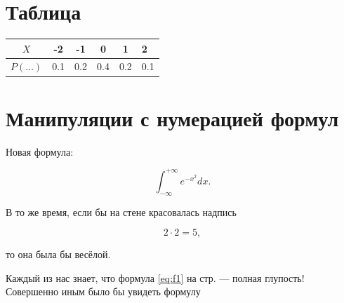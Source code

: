 \documentclass[12pt, a4paper]{article}  %
\begin{document}
% 
% 
%



\section{Таблица} 

\begin{tabular}{|c|c|c|cc|p{6cm}|}
	\hline
	$X$ & -2 & -1 & 0 & 1 & 2 \\
	\hline
	$P(\ldots)$ & 0.1 & 0.2 & 0.4 & 0.2 & 0.1 \\
\end{tabular}





\newpage  %

\section{Манипуляции с нумерацией формул} 

Новая формула: 

\begin{equation}
\int_{-\infty}^{+\infty} e^{-x^2} dx.
\end{equation}

В то же время, если бы на стене красовалась надпись

\begin{equation}\label{eq:f1}
2 \cdot 2 = 5,
\end{equation}

то она была бы весёлой.

Каждый из нас знает, что формула \eqref{eq:f1}  на стр. \pageref{eq:f1} --- полная глупость! Совершенно иным было бы увидеть формулу
\end{document}
